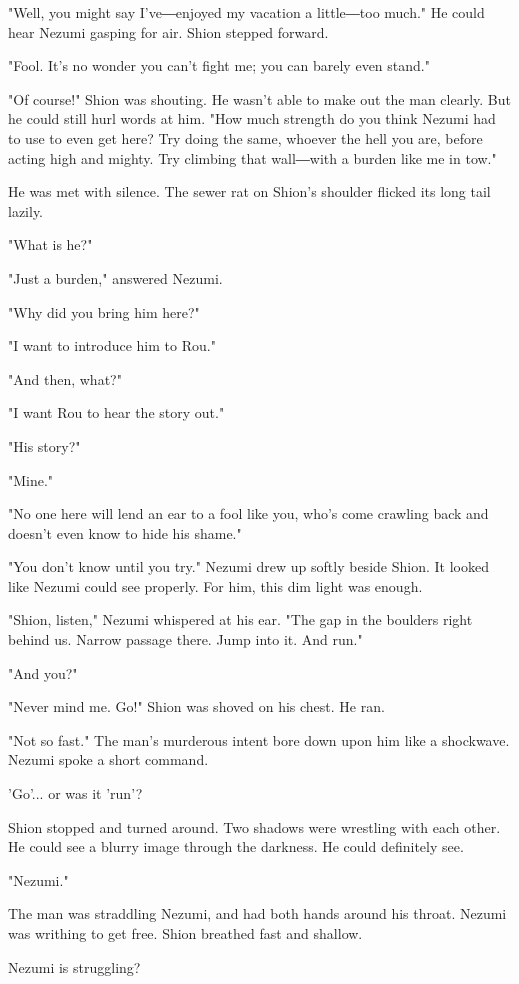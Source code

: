 "Well, you might say I've―enjoyed my vacation a little―too much." He
could hear Nezumi gasping for air. Shion stepped forward.

"Fool. It's no wonder you can't fight me; you can barely even stand."

"Of course!" Shion was shouting. He wasn't able to make out the man
clearly. But he could still hurl words at him. "How much strength do you
think Nezumi had to use to even get here? Try doing the same, whoever
the hell you are, before acting high and mighty. Try climbing that
wall―with a burden like me in tow."

He was met with silence. The sewer rat on Shion's shoulder flicked its
long tail lazily.

"What is he?"

"Just a burden," answered Nezumi.

"Why did you bring him here?"

"I want to introduce him to Rou."

"And then, what?"

"I want Rou to hear the story out."

"His story?"

"Mine."

"No one here will lend an ear to a fool like you, who's come crawling
back and doesn't even know to hide his shame."

"You don't know until you try." Nezumi drew up softly beside Shion. It
looked like Nezumi could see properly. For him, this dim light was
enough.

"Shion, listen," Nezumi whispered at his ear. "The gap in the boulders
right behind us. Narrow passage there. Jump into it. And run."

"And you?"

"Never mind me. Go!" Shion was shoved on his chest. He ran.

"Not so fast." The man's murderous intent bore down upon him like a
shockwave. Nezumi spoke a short command.

'Go'... or was it 'run'?

Shion stopped and turned around. Two shadows were wrestling with each
other. He could see a blurry image through the darkness. He could
definitely see.

"Nezumi."

The man was straddling Nezumi, and had both hands around his throat.
Nezumi was writhing to get free. Shion breathed fast and shallow.

Nezumi is struggling?

